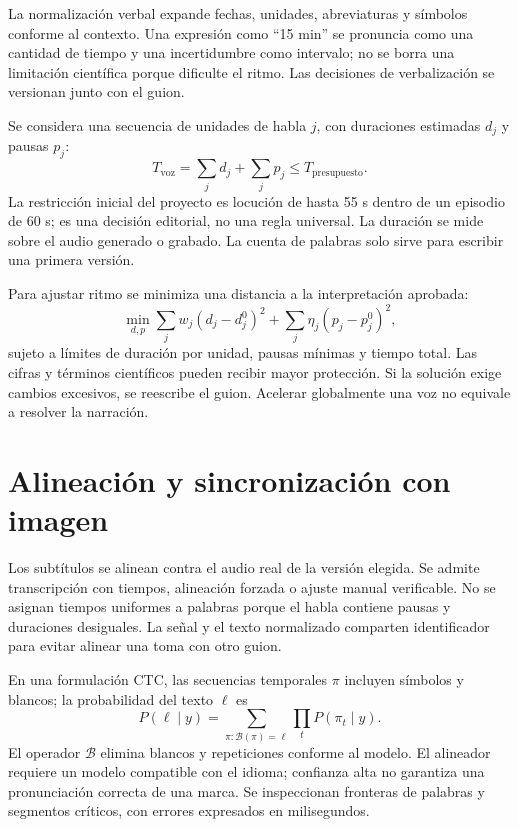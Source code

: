 La normalización verbal expande fechas, unidades, abreviaturas y símbolos conforme al contexto. Una expresión como ``15 min'' se pronuncia como una cantidad de tiempo y una incertidumbre como intervalo; no se borra una limitación científica porque dificulte el ritmo. Las decisiones de verbalización se versionan junto con el guion.

Se considera una secuencia de unidades de habla $j$, con duraciones estimadas $d_j$ y pausas $p_j$:
\begin{equation}
 T_{\mathrm{voz}}=\sum_jd_j+\sum_jp_j\leq T_{\mathrm{presupuesto}}.
\end{equation}
La restricción inicial del proyecto es locución de hasta 55 s dentro de un episodio de 60 s; es una decisión editorial, no una regla universal. La duración se mide sobre el audio generado o grabado. La cuenta de palabras solo sirve para escribir una primera versión.

Para ajustar ritmo se minimiza una distancia a la interpretación aprobada:
\begin{equation}
 \min_{d,p}\sum_jw_j(d_j-d_j^0)^2+\sum_j\eta_j(p_j-p_j^0)^2,
\end{equation}
sujeto a límites de duración por unidad, pausas mínimas y tiempo total. Las cifras y términos científicos pueden recibir mayor protección. Si la solución exige cambios excesivos, se reescribe el guion. Acelerar globalmente una voz no equivale a resolver la narración.

\section{Alineación y sincronización con imagen}
Los subtítulos se alinean contra el audio real de la versión elegida. Se admite transcripción con tiempos, alineación forzada o ajuste manual verificable. No se asignan tiempos uniformes a palabras porque el habla contiene pausas y duraciones desiguales. La señal y el texto normalizado comparten identificador para evitar alinear una toma con otro guion.

En una formulación CTC, las secuencias temporales $\pi$ incluyen símbolos y blancos; la probabilidad del texto $\ell$ es
\begin{equation}
 P(\ell\mid y)=\sum_{\pi:\mathcal B(\pi)=\ell}\prod_tP(\pi_t\mid y).
\end{equation}
El operador $\mathcal B$ elimina blancos y repeticiones conforme al modelo. El alineador requiere un modelo compatible con el idioma; confianza alta no garantiza una pronunciación correcta de una marca. Se inspeccionan fronteras de palabras y segmentos críticos, con errores expresados en milisegundos.

